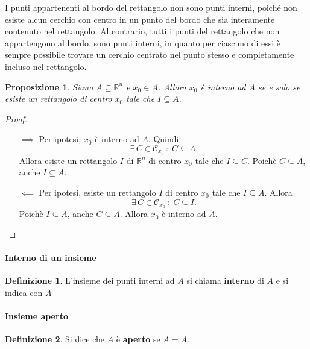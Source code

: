 \documentclass{article}
\theoremstyle{plain}
\newtheorem{prop}[thm]{Proposizione}
\theoremstyle{definition}
\newtheorem{defn}{Definizione}[section]
\theoremstyle{remark}
\begin{document}
I punti appartenenti al bordo del rettangolo non sono punti interni, poiché non esiste alcun cerchio con centro in un punto del bordo che sia interamente contenuto nel rettangolo. 
Al contrario, tutti i punti del rettangolo che non appartengono al bordo, sono punti interni, in quanto per ciascuno di essi è sempre possibile trovare un cerchio centrato nel punto stesso e 
completamente incluso nel rettangolo.

\vspace{10pt}

\begin{bxthm}
\begin{prop}
    Siano $A\subseteq\mathbb{R}^n$ e $x_0\in A$.
    Allora $x_0$ è interno ad $A$ se e solo se esiste un rettangolo di centro $x_0$ tale che $I\subseteq A$.
\end{prop}
\end{bxthm}
\begin{proof}\hfill
    \begin{itemize}
        \item[$\implies$]
        Per ipotesi, $x_0$ è interno ad $A$. Quindi 
        \[\exists\,C\in\mathcal{C}_{x_0}\,:\;C\subseteq A.\]
        Allora esiste un rettangolo $I$ di $\mathbb{R}^n$ di centro $x_0$ tale che $I\subseteq C$. 
        Poichè $C\subseteq A$, anche $I\subseteq A$.
        \item[$\impliedby$] 
        Per ipotesi, esiste un rettangolo $I$ di centro $x_0$ tale che $I\subseteq A$. 
        Allora \[\exists\,C\in\mathcal{C}_{x_0}\,:\;C\subseteq I.\]
        Poichè $I\subseteq A$, anche $C\subseteq A$. Allora $x_0$ è interno ad $A$.
    \end{itemize}
\end{proof}

\vspace{10pt}

\paragraph{Interno di un insieme}
\begin{bxthm}
\begin{defn}
    L'insieme dei punti interni ad $A$ si chiama \textbf{interno} di $A$ e si indica con $\dot{A}$ 
\end{defn}
\end{bxthm}

\vspace{10pt}

\paragraph{Insieme aperto}
\begin{bxthm}
\begin{defn}
    Si dice che $A$ è \textbf{aperto} se $A=\dot{A}$.
\end{defn}
\end{bxthm}
\end{document}
